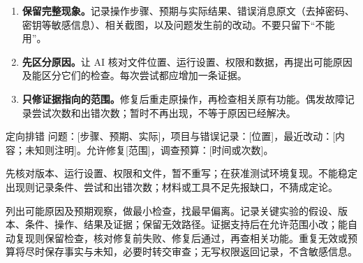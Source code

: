 \begin{enumerate}
\item \textbf{保留完整现象。}记录操作步骤、预期与实际结果、错误消息原文（去掉密码、密钥等敏感信息）、相关截图，以及问题发生前的改动。不要只留下“不能用”。
\item \textbf{先区分原因。}让 AI 核对文件位置、运行设置、权限和数据，再提出可能原因及能区分它们的检查。每次尝试都应增加一条证据。
\item \textbf{只修证据指向的范围。}修复后重走原操作，再检查相关原有功能。偶发故障记录尝试次数和出错次数；暂时不再出现，不等于原因已经解决。
\end{enumerate}
\begin{prompt}{定向排错}
问题：[步骤、预期、实际]，项目与错误记录：[位置]，最近改动：[内容；未知则注明]。允许修复[范围]，调查预算：[时间或次数]。\par
先核对版本、运行设置、权限和文件，暂不重写；在获准测试环境复现。不能稳定出现则记录条件、尝试和出错次数；材料或工具不足先报缺口，不猜成定论。\par
列出可能原因及预期观察，做最小检查，找最早偏离。记录关键实验的假设、版本、条件、操作、结果及证据；保留无效路径。证据支持后在允许范围小改；能自动复现则保留检查，核对修复前失败、修复后通过，再查相关功能。重复无效或预算将尽时保存事实与未知，必要时转交审查；无写权限返回记录，不含敏感信息。
\end{prompt}
